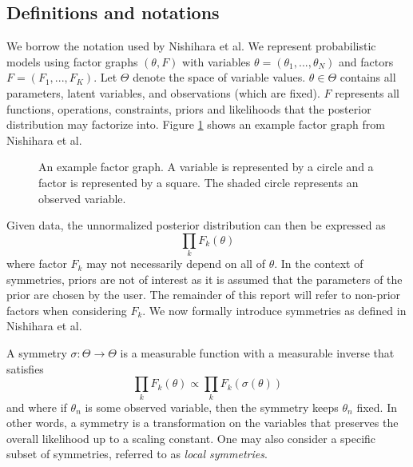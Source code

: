 \subsection{Definitions and notations}

We borrow the notation used by Nishihara et al. We represent probabilistic models using factor graphs $(\theta,F)$ with variables $\theta=(\theta_1,...,\theta_N)$ and factors $F=(F_1,...,F_K)$. Let $\Theta$ denote the space of variable values. $\theta\in\Theta$ contains all parameters, latent variables, and observations (which are fixed). $F$ represents all functions, operations, constraints, priors and likelihoods that the posterior distribution may factorize into. Figure \ref{fig:factorgraph} shows an example factor graph from Nishihara et al.

\begin{figure}[h]
\begin{center}
\end{center}
\caption{An example factor graph. A variable is represented by a circle and a factor is represented by a square. The shaded circle represents an observed variable.}
\label{fig:factorgraph}
\end{figure}

Given data, the unnormalized posterior distribution can then be expressed as
\[
\prod_kF_k(\theta)
\]
where factor $F_k$ may not necessarily depend on all of $\theta$. In the context of symmetries, priors are not of interest as it is assumed that the parameters of the prior are chosen by the user. The remainder of this report will refer to non-prior factors when considering $F_k$. We now formally introduce symmetries as defined in Nishihara et al.
\begin{defn}
A symmetry $\sigma:\Theta\rightarrow\Theta$ is a measurable function with a measurable inverse that satisfies
\[
\prod_kF_k(\theta) \propto \prod_kF_k(\sigma(\theta))
\]
and where if $\theta_n$ is some observed variable, then the symmetry keeps $\theta_n$ fixed. In other words, a symmetry is a transformation on the variables that preserves the overall likelihood up to a scaling constant. One may also consider a specific subset of symmetries, referred to as \textit{local symmetries}.
\end{defn}

